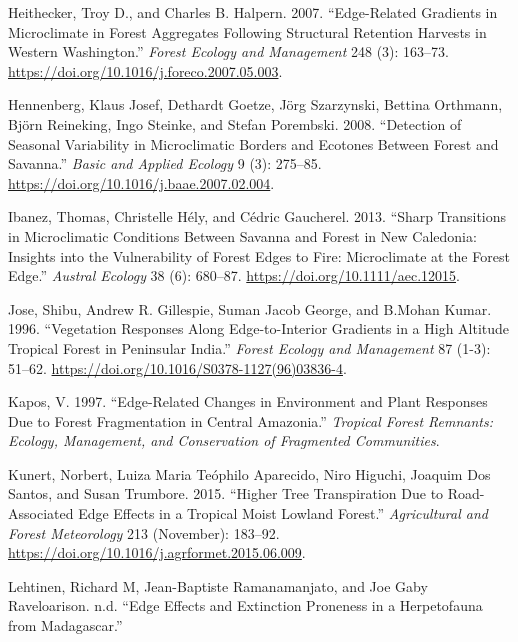 \documentclass[
  12pt,
]{article}
\newlength{\cslhangindent}
\newenvironment{CSLReferences}[2] %
 {\begin{list}{}{%
  \setlength{\itemindent}{0pt}
  \setlength{\leftmargin}{0pt}
  \setlength{\parsep}{0pt}
  \ifodd #1
   \setlength{\leftmargin}{\cslhangindent}
   \setlength{\itemindent}{-1\cslhangindent}
  \fi
  \setlength{\itemsep}{#2\baselineskip}}}
 {\end{list}}
\begin{document}
\begin{CSLReferences}{1}{0}
Heithecker, Troy D., and Charles B. Halpern. 2007. {``Edge-Related
Gradients in Microclimate in Forest Aggregates Following Structural
Retention Harvests in Western {Washington}.''} \emph{Forest Ecology and
Management} 248 (3): 163--73.
\url{https://doi.org/10.1016/j.foreco.2007.05.003}.

Hennenberg, Klaus Josef, Dethardt Goetze, Jörg Szarzynski, Bettina
Orthmann, Björn Reineking, Ingo Steinke, and Stefan Porembski. 2008.
{``Detection of Seasonal Variability in Microclimatic Borders and
Ecotones Between Forest and Savanna.''} \emph{Basic and Applied Ecology}
9 (3): 275--85. \url{https://doi.org/10.1016/j.baae.2007.02.004}.

Ibanez, Thomas, Christelle Hély, and Cédric Gaucherel. 2013. {``Sharp
Transitions in Microclimatic Conditions Between Savanna and Forest in
{New} {Caledonia}: {Insights} into the Vulnerability of Forest Edges to
Fire: {Microclimate} at the {Forest} {Edge}.''} \emph{Austral Ecology}
38 (6): 680--87. \url{https://doi.org/10.1111/aec.12015}.

Jose, Shibu, Andrew R. Gillespie, Suman Jacob George, and B.Mohan Kumar.
1996. {``Vegetation Responses Along Edge-to-Interior Gradients in a High
Altitude Tropical Forest in Peninsular {India}.''} \emph{Forest Ecology
and Management} 87 (1-3): 51--62.
\url{https://doi.org/10.1016/S0378-1127(96)03836-4}.

Kapos, V. 1997. {``Edge-Related Changes in Environment and Plant
Responses Due to Forest Fragmentation in Central {Amazonia}.''}
\emph{Tropical Forest Remnants: Ecology, Management, and Conservation of
Fragmented Communities}.

Kunert, Norbert, Luiza Maria Teóphilo Aparecido, Niro Higuchi, Joaquim
Dos Santos, and Susan Trumbore. 2015. {``Higher Tree Transpiration Due
to Road-Associated Edge Effects in a Tropical Moist Lowland Forest.''}
\emph{Agricultural and Forest Meteorology} 213 (November): 183--92.
\url{https://doi.org/10.1016/j.agrformet.2015.06.009}.

Lehtinen, Richard M, Jean-Baptiste Ramanamanjato, and Joe Gaby
Raveloarison. n.d. {``Edge Effects and Extinction Proneness in a
Herpetofauna from {Madagascar}.''}


\end{CSLReferences}
\end{document}
